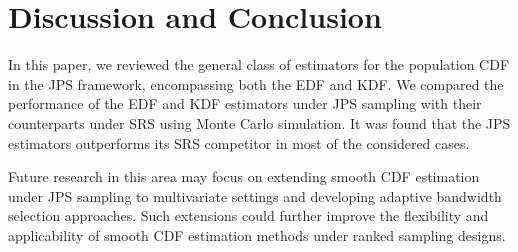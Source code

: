 \documentclass[twoside]{article}
\begin{document}


\section*{Discussion and Conclusion}   
In this paper, we reviewed the general class of estimators for the population CDF in the JPS framework, encompassing both the EDF and KDF.
We compared the performance of the EDF and KDF estimators under JPS sampling with their counterparts under SRS using Monte Carlo simulation.
 It was found that the JPS estimators outperforms its  SRS competitor in most of the considered cases. 
 
{\color{blue} Future research in this area may focus on extending smooth CDF estimation under JPS sampling to multivariate settings and developing adaptive bandwidth selection approaches. Such extensions could further improve the flexibility and applicability of smooth CDF estimation methods under ranked sampling designs.}
\end{document}
